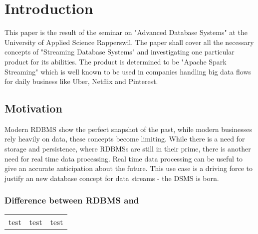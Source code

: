 \chapter{Introduction}

This paper is the result of the seminar on "Advanced Database Systems" at the University of Applied Science Rapperswil. The paper shall cover all the necessary concepts of "Streaming Database Systems" and investigating one particular product for its abilities. The product is determined to be "Apache Spark Streaming" which is well known to be used in companies handling big data flows for daily business like Uber\cite{uber}, Netflix and Pinterest.

\section{Motivation}
Modern \Gls{RDBMS} show the perfect snapshot of the past, while modern businesses rely heavily on data, these concepts become limiting. While there is a need for storage and persistence, where \Gls{RDBMS}s are still in their prime, there is another need for real time data processing. Real time data processing can be useful to give an accurate anticipation about the future. This use case is a driving force to justify an new database concept for data streams - the \Gls{DSMS} is born. 
\\
\subsection{Difference between \Gls{RDBMS} and }
\begin{tabular}{lll}
test & test & test \\
\end{tabular}